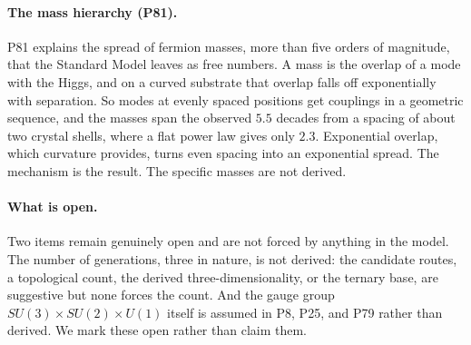 \paragraph{The mass hierarchy (P81).}
P81 explains the spread of fermion masses, more than five orders of magnitude, that the Standard
Model leaves as free numbers. A mass is the overlap of a mode with the Higgs, and on a curved
substrate that overlap falls off exponentially with separation. So modes at evenly spaced positions
get couplings in a geometric sequence, and the masses span the observed $5.5$ decades from a spacing
of about two crystal shells, where a flat power law gives only $2.3$. Exponential overlap, which
curvature provides, turns even spacing into an exponential spread. The mechanism is the result. The
specific masses are not derived.

\paragraph{What is open.}
Two items remain genuinely open and are not forced by anything in the model. The number of
generations, three in nature, is not derived: the candidate routes, a topological count, the derived
three-dimensionality, or the ternary base, are suggestive but none forces the count. And the gauge
group $SU(3) \times SU(2) \times U(1)$ itself is assumed in P8, P25, and P79 rather than derived. We
mark these open rather than claim them.
